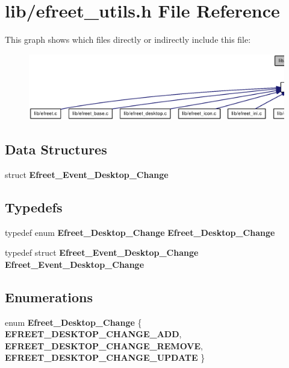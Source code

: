 \section{lib/efreet\_\-utils.h File Reference}
\label{efreet__utils_8h}




This graph shows which files directly or indirectly include this file:\nopagebreak
\begin{figure}[H]
\begin{center}
\leavevmode
\includegraphics[width=420pt]{efreet__utils_8h__dep__incl}
\end{center}
\end{figure}
\subsection*{Data Structures}
\begin{CompactItemize}
\item 
struct {\bf Efreet\_\-Event\_\-Desktop\_\-Change}
\end{CompactItemize}
\subsection*{Typedefs}
\begin{CompactItemize}
\item 
typedef enum {\bf Efreet\_\-Desktop\_\-Change} {\bf Efreet\_\-Desktop\_\-Change}
\item 
typedef struct {\bf Efreet\_\-Event\_\-Desktop\_\-Change} {\bf Efreet\_\-Event\_\-Desktop\_\-Change}
\end{CompactItemize}
\subsection*{Enumerations}
\begin{CompactItemize}
\item 
enum {\bf Efreet\_\-Desktop\_\-Change} \{ {\bf EFREET\_\-DESKTOP\_\-CHANGE\_\-ADD}, 
{\bf EFREET\_\-DESKTOP\_\-CHANGE\_\-REMOVE}, 
{\bf EFREET\_\-DESKTOP\_\-CHANGE\_\-UPDATE}
 \}
\end{CompactItemize}
